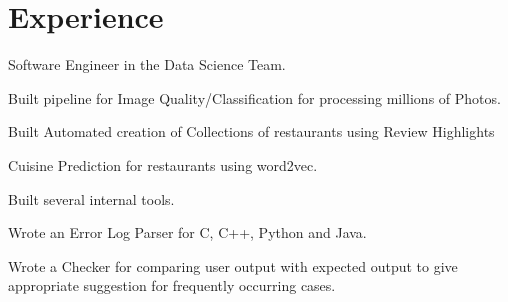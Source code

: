 \documentclass[]{deedy-resume-openfont}
\begin{document}
\begin{minipage}[t]{0.66\textwidth} 


\section{Experience}

\vspace{\topsep} %
\begin{tightemize}

\item Software Engineer in the Data Science Team.
\end{tightemize}
\sectionsep

\vspace{\topsep} %
\begin{tightemize}
\item Built pipeline for Image Quality/Classification for processing millions of Photos.
\item Built Automated creation of Collections of restaurants using Review Highlights
\item Cuisine Prediction for restaurants using word2vec.
\item Built several internal tools.
\end{tightemize}
\sectionsep


\vspace{\topsep} %
\begin{tightemize}
\item Wrote an Error Log Parser for C, C++, Python and Java.
\item Wrote a Checker for comparing user output with expected output to give appropriate suggestion for frequently occurring cases. 
\end{tightemize}
\sectionsep


\end{minipage}
\end{document}
